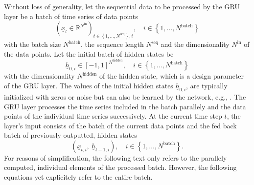 Without loss of generality,
let the sequential data to be processed by the GRU layer
be a batch of time series of data points
\begin{equation}
    \left(
        \underline x_t
        \in \mathbb{R}^{N^\text{in}}
    \right)_{
        t \in \left\{
            1, \dots, N^\text{seq}
        \right\}
        ,
        i
    }
    ,\quad
    i \in \left\{
        1, \dots, N^\text{batch}
    \right\}
\end{equation}
with the batch size $N^\text{batch}$, 
the sequence length $N^\text{seq}$
and the dimensionality $N^\text{in}$ of the data points.
Let the initial batch of hidden states be
\begin{equation} \label{eq:gru_init_hidden_state}
    \underline h_{0,i}
    \in \left[-1, 1\right]^{N^\text{hidden}}
    ,\quad
    i \in \left\{
        1, \dots, N^\text{batch}
    \right\}
\end{equation}
with the dimensionality $N^\text{hidden}$ of the hidden state,
which is a design parameter of the GRU layer.
The values of the initial hidden states $\underline h_{0,i}$,
are typically initialized with zeros or noise \cite{Zimmermann2012}
but can also be learned by the network, e.g., \cite{Forcada1995}.
The GRU layer processes the time series included in the batch parallely 
and the data points of the individual time series successively.
At the current time step $t$,
the layer's input consists of 
the batch of the current data points
and the fed back batch of previously outputted, hidden states
\begin{equation}
    \left(
    \underline x_{t,i}
    ,\ 
    \underline h_{t-1,i}
    \right)
    ,\quad
    i \in \left\{
        1, \dots, N^\text{batch}
    \right\}.
\end{equation}
For reasons of simplification,
the following text only refers to the parallely computed, 
individual elements of the processed batch.
However, the following equations yet explicitely refer to the entire batch.


